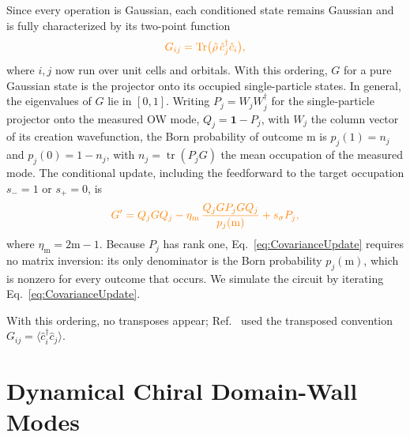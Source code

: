 \documentclass[aps,prb,10pt,twocolumn,superscriptaddress,longbibliography,floatfix]{revtex4-2}
\newcommand{\Id}{\mathbf{1}}
\newcommand{\newtext}[1]{{\color{blue}#1}}
\newcommand{\claudeadd}[1]{{\color{orange}#1}}
\begin{document}
Since every operation is Gaussian, each conditioned state remains Gaussian and is fully characterized by its two-point function
\begin{equation}
    \claudeadd{G_{ij}=\Tr\!\big(\hat\rho\,\hat c_j^\dagger\hat c_i\big),}
    \label{eq:TwoPoint}
\end{equation}
where $i,j$ now run over unit cells and orbitals. With this ordering, \claudeadd{$G$} for a pure Gaussian state is the projector onto its occupied single-particle states. In general, \newtext{the eigenvalues of $G$} lie in $[0,1]$. Writing \claudeadd{$P_j=W_jW_j^\dagger$} for the single-particle projector onto the measured OW mode, $Q_j=\Id-P_j$, \newtext{with $W_j$ the column vector of its creation wavefunction,} the Born probability of outcome $\mathrm m$ is \claudeadd{$p_j(1)=n_j$ and $p_j(0)=1-n_j$, with $n_j=\operatorname{tr}(P_jG)$ the mean occupation of the measured mode}. The conditional update, including the feedforward to the target occupation $s_-=1$ or $s_+=0$, is~\cite{bravyi2004lagrangian,BhuiyanPanJian2026}
\begin{equation}
    \claudeadd{G'=Q_jGQ_j-\eta_{\mathrm m}\,\frac{Q_jGP_jGQ_j}{p_j(\mathrm m)}+s_\sigma P_j,}
    \label{eq:CovarianceUpdate}
\end{equation}
\claudeadd{where $\eta_{\mathrm m}=2\mathrm m-1$. Because $P_j$ has rank one, Eq.~\eqref{eq:CovarianceUpdate} requires no matrix inversion: its only denominator is the Born probability $p_j(\mathrm m)$, which is nonzero for every outcome that occurs.} We simulate the circuit by iterating Eq.~\eqref{eq:CovarianceUpdate}.

\claudeadd{With this ordering, no transposes appear; Ref.~\cite{BhuiyanPanJian2026} used the transposed convention $G_{ij}=\langle\hat c_i^\dagger\hat c_j\rangle$.}

\FloatBarrier
\section{Dynamical Chiral Domain-Wall Modes}
\label{sec:Results}
\end{document}
